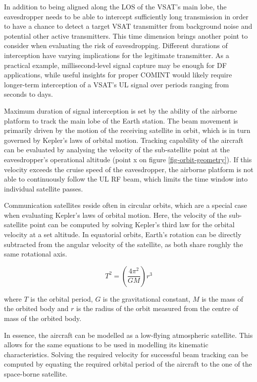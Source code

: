\documentclass[english, 12pt, a4paper, elec, utf8, a-1b, online]{aaltothesis}
\begin{document}
In addition to being aligned along the LOS of the VSAT's main lobe, the eavesdropper needs to be able to intercept sufficiently long transmission in order to have a chance to detect a target VSAT transmitter from background noise and potential other active transmitters.
This time dimension brings another point to consider when evaluating the risk of eavesdropping.
Different durations of interception have varying implications for the legitimate transmitter.
As a practical example, millisecond-level signal capture may be enough for DF applications, while useful insights for proper COMINT would likely require longer-term interception of a VSAT's UL signal over periods ranging from seconds to days.

Maximum duration of signal interception is set by the ability of the airborne platform to track the main lobe of the Earth station.
The beam movement is primarily driven by the motion of the receiving satellite in orbit, which is in turn governed by Kepler's laws of orbital motion.
Tracking capability of the aircraft can be evaluated by analysing the velocity of the sub-satellite point at the eavesdropper's operational altitude (point x on figure \ref{fig-orbit-geometry}). %
If this velocity exceeds the cruise speed of the eavesdropper, the airborne platform is not able to continuously follow the UL RF beam, which limits the time window into individual satellite passes.

Communication satellites reside often in circular orbits, which are a special case when evaluating Kepler's laws of orbital motion.
Here, the velocity of the sub-satellite point can be computed by solving Kepler's third law for the orbital velocity at a set altitude.
In equatorial orbits, Earth's rotation can be directly subtracted from the angular velocity of the satellite, as both share roughly the same rotational axis.

\begin{equation} \label{eq-kepler-3}
  T^2 = (\frac{4\pi^2}{GM})r^3
\end{equation}

where $T$ is the orbital period, $G$ is the gravitational constant, $M$ is the mass of the orbited body and $r$ is the radius of the orbit measured from the centre of mass of the orbited body.

In essence, the aircraft can be modelled as a low-flying atmospheric satellite.
This allows for the same equations to be used in modelling its kinematic characteristics.
Solving the required velocity for successful beam tracking can be computed by equating the required orbital period of the aircraft to the one of the space-borne satellite.
\end{document}
